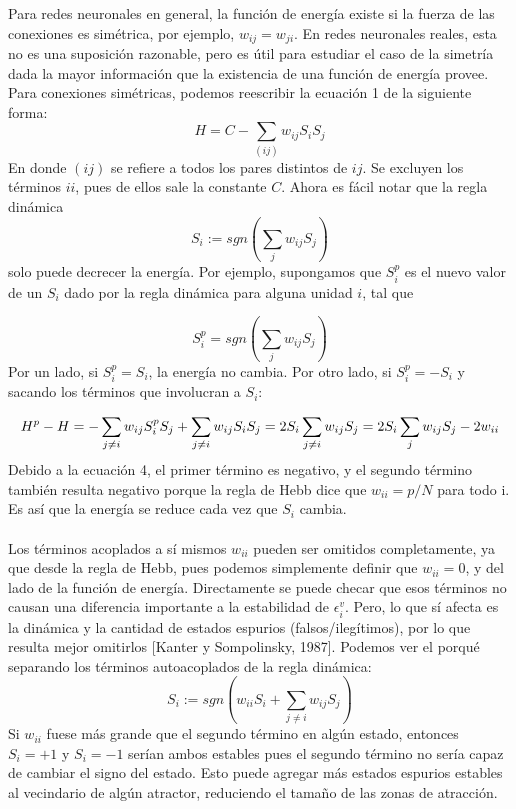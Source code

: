 \documentclass{article}
\begin{document}
Para redes neuronales en general, la función de energía existe si la fuerza de las conexiones es simétrica, por ejemplo, $w_{ij} = w_{ji}$. En redes neuronales reales, esta no es una suposición razonable, pero es útil para estudiar el caso de la simetría dada la mayor información que la existencia de una función de energía provee. Para conexiones simétricas, podemos reescribir la ecuación 1 de la siguiente forma:
\begin{equation}
    H  = C - \sum_{(ij)}w_{ij} S_iS_j
    \label{Función de energía de conexiones simétricas}
\end{equation}
En donde $(ij)$ se refiere a todos los pares distintos de $ij$. Se excluyen los términos $ii$, pues de ellos sale la constante $C$.
Ahora es fácil notar que la regla dinámica
\begin{equation}
    S_i := sgn(\sum_jw_{ij}S_j)
    \label{modelo de la neurona}
\end{equation}
solo puede decrecer la energía. Por ejemplo, supongamos que $S_i^p$ es el nuevo valor de un $S_i$ dado por la regla dinámica para alguna unidad $i$, tal que

\begin{equation}
    S_i^p = sgn(\sum_j w_{ij}S_j)
    \label{actualización de $S_i$}
\end{equation}
Por un lado, si $S_i^p = S_i$, la energía no cambia. Por otro lado, si $S_i^p = -S_i$ y sacando los términos que involucran a $S_i$:

\begin{equation}
    H^p- H = - \sum_{j\neq i} w_{ij}S_i^pS_j + \sum_{j\neq i} w_{ij}S_iS_j  \\\\
    =2S_i\sum_{j\neq i}w_{ij}S_j \\\\
    = 2S_i \sum_j w_{ij}S_j - 2w_{ii}
    \label{}
\end{equation}
Debido a la ecuación 4, el primer término es negativo, y el segundo término también resulta negativo porque la regla de Hebb dice que $w_{ii}= p/N$ para todo i. Es así que la energía se reduce cada vez que $S_i$ cambia.
\\\\
Los términos acoplados a sí mismos $w_{ii}$ pueden ser omitidos completamente, ya que desde la regla de Hebb, pues podemos simplemente definir que $w_{ii}=0$, y del lado de la función de energía. Directamente se puede checar que esos términos no causan una diferencia importante a la estabilidad de $\epsilon_i^v$. Pero, lo que sí afecta es la dinámica y la cantidad de estados espurios (falsos/ilegítimos), por lo que resulta  mejor omitirlos [Kanter y Sompolinsky, 1987]. Podemos ver el porqué separando los términos autoacoplados de la regla dinámica:
\begin{equation}
    S_i := sgn(w_{ii}S_i + \sum_{j\neq i}w_{ij}S_j)
    \label{2.28}
\end{equation}
Si $w_{ii}$ fuese más grande que el segundo término en algún estado, entonces $S_i = +1$ y $S_i = -1$ serían ambos estables pues el segundo término no sería capaz de cambiar el signo del estado. Esto puede agregar más estados espurios estables al vecindario de algún atractor, reduciendo el tamaño de las zonas de atracción. 
\end{document}
